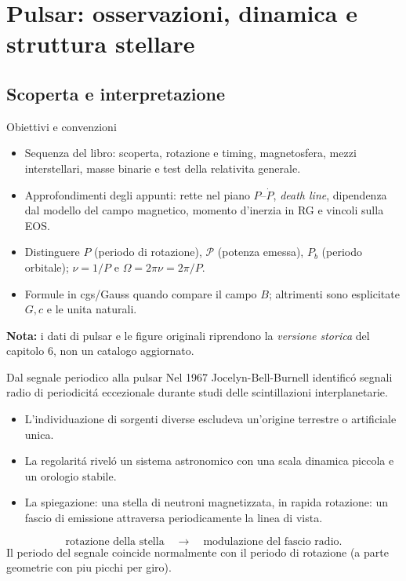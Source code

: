 \section{Pulsar: osservazioni, dinamica e struttura stellare}

\subsection{Scoperta e interpretazione}

\begin{frame}[t]{Obiettivi e convenzioni}
\small
\begin{itemize}
\item Sequenza del libro: scoperta, rotazione e timing, magnetosfera, mezzi interstellari, masse binarie e test della relativita generale.
\item Approfondimenti degli appunti: rette nel piano $P$--$\dot P$, \emph{death line}, dipendenza dal modello del campo magnetico, momento d'inerzia in RG e vincoli sulla EOS.
\item Distinguere $P$ (periodo di rotazione), $\mathcal P$ (potenza emessa), $P_b$ (periodo orbitale); $\nu=1/P$ e $\Omega=2\pi\nu=2\pi/P$.
\item Formule in cgs/Gauss quando compare il campo $B$; altrimenti sono esplicitate $G,c$ e le unita naturali.
\end{itemize}
\medskip
\textbf{Nota:} i dati di pulsar e le figure originali riprendono la \emph{versione storica} del capitolo 6, non un catalogo aggiornato.
\end{frame}

\begin{frame}[t]{Dal segnale periodico alla pulsar}
\small
Nel 1967 Jocelyn-Bell-Burnell identific\'o segnali radio di periodicit\'a eccezionale durante studi delle scintillazioni interplanetarie.
\begin{itemize}
\item L'individuazione di sorgenti diverse escludeva un'origine terrestre o artificiale unica.
\item La regolarit\'a rivel\'o un sistema astronomico con una scala dinamica piccola e un orologio stabile.
\item La spiegazione: una stella di neutroni magnetizzata, in rapida rotazione: un fascio di emissione attraversa periodicamente la linea di vista.
\end{itemize}
\[
\text{rotazione della stella}\quad\longrightarrow\quad\text{modulazione del fascio radio}.
\]
Il periodo del segnale coincide normalmente con il periodo di rotazione (a parte geometrie con piu picchi per giro).
\end{frame}

